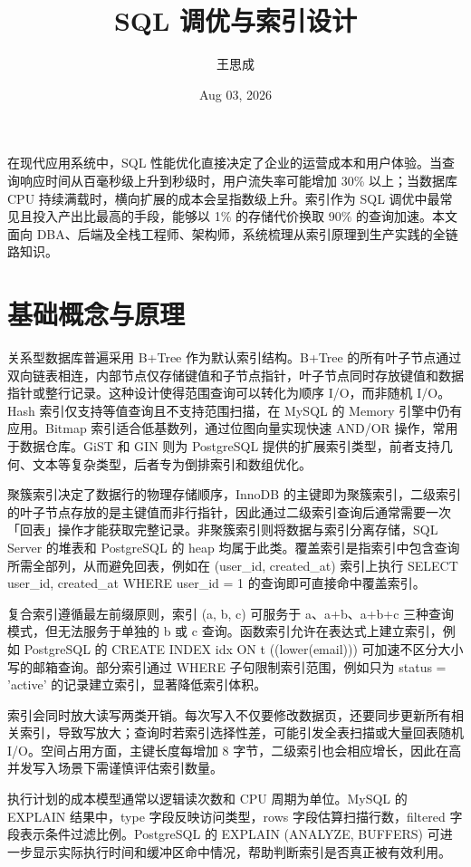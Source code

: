 \title{SQL 调优与索引设计}
\author{王思成}
\date{Aug 03, 2026}
\maketitle
在现代应用系统中，SQL 性能优化直接决定了企业的运营成本和用户体验。当查询响应时间从百毫秒级上升到秒级时，用户流失率可能增加 30\%{} 以上；当数据库 CPU 持续满载时，横向扩展的成本会呈指数级上升。索引作为 SQL 调优中最常见且投入产出比最高的手段，能够以 1\%{} 的存储代价换取 90\%{} 的查询加速。本文面向 DBA、后端及全栈工程师、架构师，系统梳理从索引原理到生产实践的全链路知识。\par
\chapter{基础概念与原理}
关系型数据库普遍采用 B+Tree 作为默认索引结构。B+Tree 的所有叶子节点通过双向链表相连，内部节点仅存储键值和子节点指针，叶子节点同时存放键值和数据指针或整行记录。这种设计使得范围查询可以转化为顺序 I/O，而非随机 I/O。Hash 索引仅支持等值查询且不支持范围扫描，在 MySQL 的 Memory 引擎中仍有应用。Bitmap 索引适合低基数列，通过位图向量实现快速 AND/OR 操作，常用于数据仓库。GiST 和 GIN 则为 PostgreSQL 提供的扩展索引类型，前者支持几何、文本等复杂类型，后者专为倒排索引和数组优化。\par
聚簇索引决定了数据行的物理存储顺序，InnoDB 的主键即为聚簇索引，二级索引的叶子节点存放的是主键值而非行指针，因此通过二级索引查询后通常需要一次「回表」操作才能获取完整记录。非聚簇索引则将数据与索引分离存储，SQL Server 的堆表和 PostgreSQL 的 heap 均属于此类。覆盖索引是指索引中包含查询所需全部列，从而避免回表，例如在 (user\_{}id, created\_{}at) 索引上执行 SELECT user\_{}id, created\_{}at WHERE user\_{}id = 1 的查询即可直接命中覆盖索引。\par
复合索引遵循最左前缀原则，索引 (a, b, c) 可服务于 a、a+b、a+b+c 三种查询模式，但无法服务于单独的 b 或 c 查询。函数索引允许在表达式上建立索引，例如 PostgreSQL 的 CREATE INDEX idx ON t ((lower(email))) 可加速不区分大小写的邮箱查询。部分索引通过 WHERE 子句限制索引范围，例如只为 status = 'active' 的记录建立索引，显著降低索引体积。\par
索引会同时放大读写两类开销。每次写入不仅要修改数据页，还要同步更新所有相关索引，导致写放大；查询时若索引选择性差，可能引发全表扫描或大量回表随机 I/O。空间占用方面，主键长度每增加 8 字节，二级索引也会相应增长，因此在高并发写入场景下需谨慎评估索引数量。\par
执行计划的成本模型通常以逻辑读次数和 CPU 周期为单位。MySQL 的 EXPLAIN 结果中，type 字段反映访问类型，rows 字段估算扫描行数，filtered 字段表示条件过滤比例。PostgreSQL 的 EXPLAIN (ANALYZE, BUFFERS) 可进一步显示实际执行时间和缓冲区命中情况，帮助判断索引是否真正被有效利用。\par
